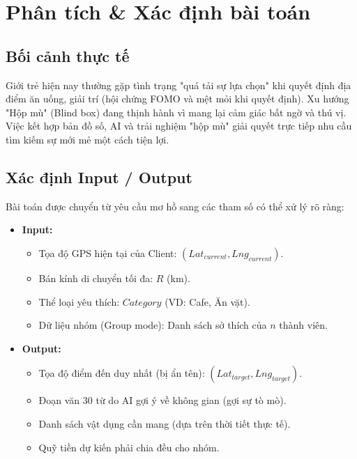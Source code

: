 \documentclass[12pt]{article}
\begin{document}
 

\tableofcontents
\pagebreak
\listoftables
\pagebreak
\listoffigures
\pagebreak

\setcounter{page}{1}


\section{Phân tích \& Xác định bài toán}
\subsection{Bối cảnh thực tế}
Giới trẻ hiện nay thường gặp tình trạng "quá tải sự lựa chọn" khi quyết định địa điểm ăn uống, giải trí (hội chứng FOMO và mệt mỏi khi quyết định). Xu hướng "Hộp mù" (Blind box) đang thịnh hành vì mang lại cảm giác bất ngờ và thú vị. Việc kết hợp bản đồ số, AI và trải nghiệm "hộp mù" giải quyết trực tiếp nhu cầu tìm kiếm sự mới mẻ một cách tiện lợi.

\subsection{Xác định Input / Output}
Bài toán được chuyển từ yêu cầu mơ hồ sang các tham số có thể xử lý rõ ràng:
\begin{itemize}
    \item \textbf{Input:} 
    \begin{itemize}
        \item Tọa độ GPS hiện tại của Client: $(Lat_{current}, Lng_{current})$.
        \item Bán kính di chuyển tối đa: $R$ (km).
        \item Thể loại yêu thích: $Category$ (VD: Cafe, Ăn vặt).
        \item Dữ liệu nhóm (Group mode): Danh sách sở thích của $n$ thành viên.
    \end{itemize}
    \item \textbf{Output:} 
    \begin{itemize}
        \item Tọa độ điểm đến duy nhất (bị ẩn tên): $(Lat_{target}, Lng_{target})$.
        \item Đoạn văn 30 từ do AI gợi ý về không gian (gợi sự tò mò).
        \item Danh sách vật dụng cần mang (dựa trên thời tiết thực tế).
        \item Quỹ tiền dự kiến phải chia đều cho nhóm.
    \end{itemize}
\end{itemize}
\end{document}
